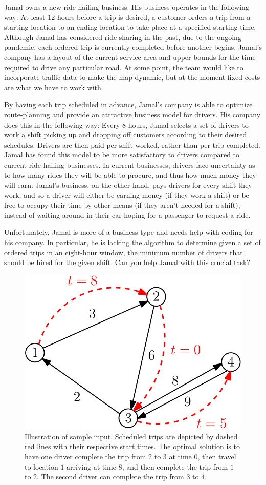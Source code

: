 
Jamal owns a new ride-hailing business. His business operates in the following way: At least $12$ hours before a trip is desired, a customer orders a trip from a starting location to an ending location to take place at a specified starting time. Although Jamal has considered ride-sharing in the past, due to the ongoing pandemic, each ordered trip is currently completed before another begins. Jamal’s company has a layout of the current service area and upper bounds for the time required to drive any particular road. At some point, the team would like to incorporate traffic data to make the map dynamic, but at the moment fixed costs are what we have to work with.

By having each trip scheduled in advance, Jamal’s company is able to optimize route-planning and provide an attractive business model for drivers. His company does this in the following way: Every $8$ hours, Jamal selects a set of drivers to work a shift picking up and dropping off customers according to their desired schedules. Drivers are then paid per shift worked, rather than per trip completed. Jamal has found this model to be more satisfactory to drivers compared to current ride-hailing businesses. In current businesses, drivers face uncertainty as to how many rides they will be able to procure, and thus how much money they will earn. Jamal’s business, on the other hand, pays drivers for every shift they work, and so a driver will either be earning money (if they work a shift) or be free to occupy their time by other means (if they aren’t needed for a shift), instead of waiting around in their car hoping for a passenger to request a ride.

Unfortunately, Jamal is more of a business-type and needs help with coding for his company. In particular, he is lacking the algorithm to determine given a set of ordered trips in an eight-hour window, the minimum number of drivers that should be hired for the given shift. Can you help Jamal with this crucial task?

\begin{figure}[h]
	\begin{center}
		\includegraphics[width=.5\textwidth]{sample-graph.png}
	\end{center}
	\caption{Illustration of sample input. Scheduled trips are depicted by dashed red lines with their respective start times. The optimal solution is to have one driver complete the trip from $2$ to $3$ at time $0$, then travel to location $1$ arriving at time $8$, and then complete the trip from $1$ to $2$. The second driver can complete the trip from $3$ to $4$.}
	\label{fig:sample}
\end{figure}

